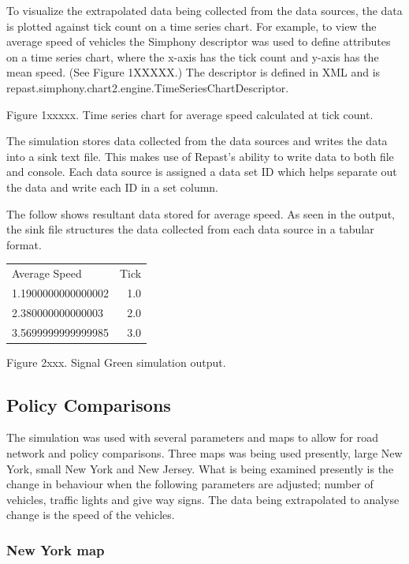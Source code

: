 \documentclass[11pt]{article}
\begin{document}
\begin{enumerate}
To visualize the extrapolated data being collected from the data sources, the data is plotted against tick count on a time series chart. For example, to view the average speed of vehicles the Simphony descriptor was used to define attributes on a time series chart, where the x-axis has the tick count and y-axis has the mean speed. (See Figure 1XXXXX.) The descriptor is defined in XML and is repast.simphony.chart2.engine.TimeSeriesChartDescriptor.

 

Figure 1xxxxx. Time series chart for average speed calculated at tick count.

The simulation stores data collected from the data sources and writes the data into a sink text file. This makes use of Repast’s ability to write data to both file and console. Each data source is assigned a data set ID which helps separate out the data and write each ID in a set column. 

The follow shows resultant data stored for average speed. As seen in the output, the sink file structures the data collected from each data source in a tabular format. 

\begin{center}
\begin{tabular}{ l | r  }
\hline
Average Speed & Tick \\
1.1900000000000002 & 1.0 \\
2.380000000000003  &  2.0 \\
3.5699999999999985 & 3.0 \\
\hline
\end{tabular}
\end{center}

Figure 2xxx. Signal Green simulation output.




\subsection{Policy Comparisons}

The simulation was used with several parameters and maps to allow for road network and policy comparisons. Three maps was being used presently, large New York, small New York and New Jersey. What is being examined presently is the change in behaviour when the following parameters are adjusted; number of vehicles, traffic lights and give way signs. The data being extrapolated to analyse change is the speed of the vehicles.


\subsubsection{New York map}



\end{enumerate}
\end{document}
